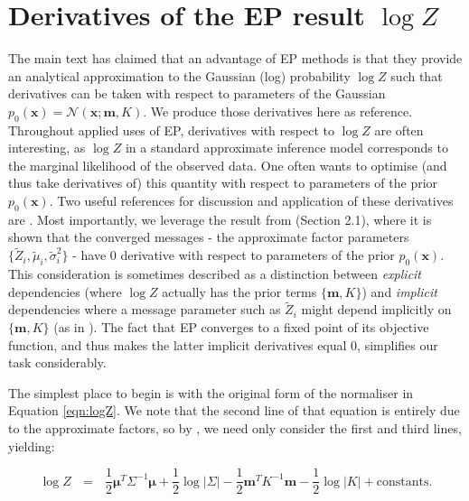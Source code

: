 \documentclass[twoside,11pt]{article}
\def\x{{\mathbf x}}
\def\m{{\mathbf m}}
\def\boldmu{\bm{\mu}}
\begin{document}
\newpage

\section{Derivatives of the EP result $\log Z$}
\label{sec:deriv}

The main text has claimed that an advantage of EP methods is that they provide an analytical approximation to the Gaussian (log) probability $\log Z$ such that derivatives can be taken with respect to parameters of the Gaussian $p_0(\x) = \mathcal{N}(\x; \m, K)$.  We produce those derivatives here as reference.  Throughout applied uses of EP, derivatives with respect to $\log Z$ are often interesting, as $\log Z$ in a standard approximate inference model corresponds to the marginal likelihood of the observed data. One often wants to optimise (and thus take derivatives of) this quantity with respect to parameters of the prior $p_0(\x)$.  Two useful references for discussion and application of these derivatives are \cite{seeger08epexpfam, rasmussenBook}.  Most importantly, we leverage the result from \cite{seeger08epexpfam} (Section 2.1), where it is shown that the converged messages - the approximate factor parameters $\{\tilde{Z}_i,\tilde{\mu}_i,\tilde{\sigma}_i^2\}$ - have 0 derivative with respect to parameters of the prior $p_0(\x)$.  This consideration is sometimes described as a distinction between \emph{explicit} dependencies (where $\log Z$ actually has the prior terms $\{\m,K\}$) and \emph{implicit} dependencies where a message parameter such as $\tilde{Z}_i$ might depend implicitly on $\{\m,K\}$ (as in \cite{rasmussenBook}).  The fact that EP converges to a fixed point of its objective function, and thus makes the latter implicit derivatives equal 0, simplifies our task considerably. 

The simplest place to begin is with the original form of the normaliser in Equation \ref{eqn:logZ}.  We note that the second line of that equation is entirely due to the approximate factors, so by \cite{seeger08epexpfam}, we need only consider the first and third lines, yielding:

\begin{equation}
\label{eqn:dlogZ}
\log Z  ~~~ = ~~~ 
\frac{1}{2}\boldmu^T\Sigma^{-1}\boldmu
+ \frac{1}{2}\log\lvert \Sigma \rvert
-\frac{1}{2}\m^TK^{-1}\m 
-\frac{1}{2}\log\lvert K \rvert  + \mathrm{constants}.
\end{equation}
\end{document}
